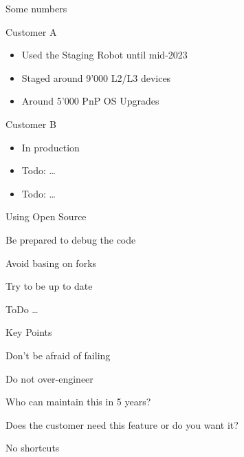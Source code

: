 \documentclass[aspectratio=169]{beamer}
\begin{document}
\begin{frame}{Some numbers}

  Customer A
  \begin{itemize}
    \item Used the Staging Robot until mid-2023
    \item Staged around 9'000 L2/L3 devices
    \item Around 5'000 PnP OS Upgrades
  \end{itemize}

  Customer B
  \begin{itemize}
    \item In production
    \item Todo: \dots
    \item Todo: \dots
  \end{itemize}


\end{frame}



\begin{frame}{Using Open Source}

  \begin{vfilleditems}
    \item Be prepared to debug the code
    \item Avoid basing on forks
    \item Try to be up to date
    \item ToDo \dots
  \end{vfilleditems}

\end{frame}


\begin{frame}{Key Points}

  \begin{vfilleditems}
    \item Don't be afraid of failing
    \item Do not over-engineer
    \item Who can maintain this in 5 years?
    \item Does the customer need this feature or do you want it?
    \item No shortcuts
  \end{vfilleditems}

\end{frame}

\end{document}
